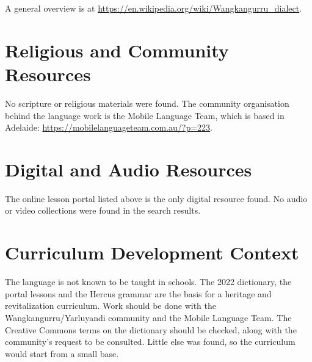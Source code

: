 \documentclass[12pt]{article}
\begin{document}
A general overview is at \url{https://en.wikipedia.org/wiki/Wangkangurru_dialect}.

\section{Religious and Community Resources}
No scripture or religious materials were found. The community organisation behind the language work is the Mobile Language Team, which is based in Adelaide: \url{https://mobilelanguageteam.com.au/?p=223}.

\section{Digital and Audio Resources}
The online lesson portal listed above is the only digital resource found. No audio or video collections were found in the search results.

\section{Curriculum Development Context}
The language is not known to be taught in schools. The 2022 dictionary, the portal lessons and the Hercus grammar are the basis for a heritage and revitalization curriculum. Work should be done with the Wangkangurru/Yarluyandi community and the Mobile Language Team. The Creative Commons terms on the dictionary should be checked, along with the community's request to be consulted. Little else was found, so the curriculum would start from a small base.
\end{document}
